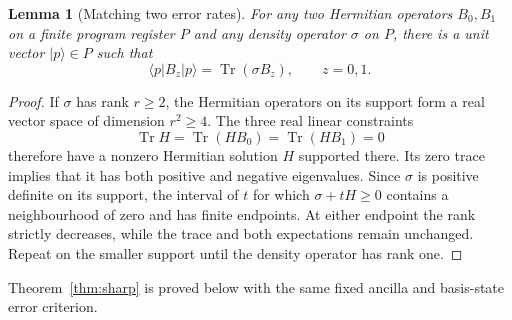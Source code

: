 \documentclass[12pt,a4paper]{article}
\newtheorem{lemma}[theorem]{Lemma}
\newcommand{\ket}[1]{|#1\rangle}
\newcommand{\Tr}{\operatorname{Tr}}
\begin{document}
\begin{lemma}[Matching two error rates]
\label{lem:twoerrors}
For any two Hermitian operators $B_0,B_1$ on a finite program register $P$ and any density operator $\sigma$ on $P$, there is a unit vector $\ket p\in P$ such that
\[
 \langle p|B_z|p\rangle=\Tr(\sigma B_z),\qquad z=0,1.
\]
\end{lemma}
\begin{proof}
If $\sigma$ has rank $r\ge2$, the Hermitian operators on its support form a real vector space of dimension $r^2\ge4$. The three real linear constraints
\[
 \Tr H=\Tr(HB_0)=\Tr(HB_1)=0
\]
therefore have a nonzero Hermitian solution $H$ supported there. Its zero trace implies that it has both positive and negative eigenvalues. Since $\sigma$ is positive definite on its support, the interval of $t$ for which $\sigma+tH\ge0$ contains a neighbourhood of zero and has finite endpoints. At either endpoint the rank strictly decreases, while the trace and both expectations remain unchanged. Repeat on the smaller support until the density operator has rank one.
\end{proof}

Theorem~\ref{thm:sharp} is proved below with the same fixed ancilla and basis-state error criterion.
\end{document}
